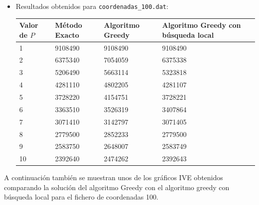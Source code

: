 \documentclass[a4paper,11pt]{article}
\begin{document}
\begin{itemize}
\item Resultados obtenidos para \texttt{coordenadas\_100.dat}:

\begin{table}[!htbp]
\label{results_100}
\centering
\begin{tabularx}{\textwidth}{|X|X|X|X|}
\hline
Valor de ${P}$	& Método Exacto	& Algoritmo Greedy & Algoritmo Greedy con búsqueda local \\ \hline
1	& 9108490	& 9108490	& 9108490	\\ \hline
2	& 6375340	& 7054059	& 6375338	\\ \hline
3	& 5206490	& 5663114	& 5323818	\\ \hline
4	& 4281110	& 4802205	& 4281107	\\ \hline
5	& 3728220	& 4154751	& 3728221	\\ \hline
6	& 3363510	& 3526319	& 3407864	\\ \hline
7	& 3071410	& 3142797	& 3071405	\\ \hline
8	& 2779500	& 2852233	& 2779500	\\ \hline
9	& 2583750	& 2648007	& 2583749	\\ \hline
10	& 2392640	& 2474262	& 2392643	\\ \hline
\end{tabularx}
\end{table}
\end{itemize}

\newpage
A continuación también se muestran unos de los gráficos IVE obtenidos comparando la solución del algoritmo Greedy con el algoritmo greedy con búsqueda local para el fichero de coordenadas 100.
\end{document}
